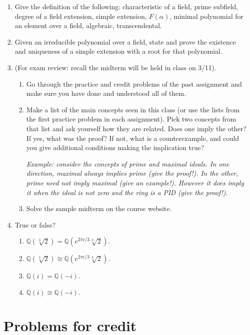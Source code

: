 \documentclass{amsart}
\theoremstyle{definition}
\newcommand{\Qq}{\mathbb{Q}}
\begin{document}
\begin{enumerate}
\item Give the definition of the following: characteristic of a field, prime subfield, degree of a field extension, simple extension, $F (\alpha)$, minimal polynomial for an element over a field, algebraic, transcendental.
\item Given an irreducible polynomial over a field, state and prove the existence and uniqueness of a simple extension with a root for that polynomial.
\item (For exam review: recall the midterm will be held in class on 3/11).
  \begin{enumerate}
  \item Go through the practice and credit problems of the past assignment and make sure you have done and understood all of them.
  \item Make a list of the main concepts seen in this class (or use the lists from the first practice problem in each assignment). Pick two concepts from that list and ask yourself how they are related. Does one imply the other? If yes, what was the proof? If not, what is a counterexample, and could you give additional conditions making the implication true?

    \emph{Example: consider the concepts of prime and maximal ideals. In one direction, maximal always implies prime (give the proof!). In the other, prime need not imply maximal (give an example!). However it does imply it when the ideal is not zero and the ring is a PID (give the proof!).}
  \item Solve the sample midterm on the course website.
  \end{enumerate}
\item True or false?
  \begin{enumerate}
  \item $\Qq (\sqrt[3]{2}) = \Qq (e^{2\pi i / 3} \sqrt[3]{2})$.
  \item $\Qq (\sqrt[3]{2}) \cong \Qq (e^{2\pi i / 3} \sqrt[3]{2})$.
  \item $\Qq (i) = \Qq (-i)$.
  \item $\Qq (i) \cong \Qq (-i)$.
  \end{enumerate}
\end{enumerate}
\section*{Problems for credit}
\end{document}

